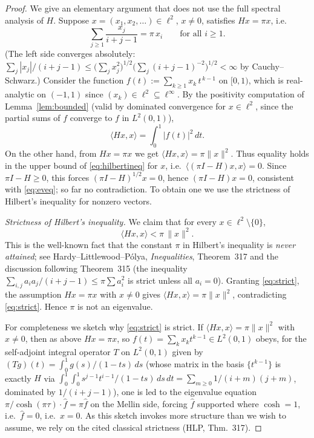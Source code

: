 \documentclass[12pt]{article}
\theoremstyle{remark}
\begin{document}
\begin{proof}
We give an elementary argument that does not use the full spectral analysis of $H$.
Suppose $x=(x_1,x_2,\dots)\in\ell^2$, $x\ne0$, satisfies $Hx=\pi x$, i.e.
\begin{equation}\label{eq:eveq}
\sum_{j\ge1}\frac{x_j}{i+j-1}=\pi\,x_i\qquad\text{for all }i\ge1 .
\end{equation}
(The left side converges absolutely: $\sum_j |x_j|/(i+j-1)\le\bigl(\sum_j x_j^2\bigr)^{1/2}
\bigl(\sum_j (i+j-1)^{-2}\bigr)^{1/2}<\infty$ by Cauchy--Schwarz.)
Consider the function $f(t):=\sum_{k\ge1}x_k\,t^{\,k-1}$ on $[0,1)$, which is real-analytic on
$(-1,1)$ since $(x_k)\in\ell^2\subseteq\ell^\infty$. By the positivity computation of
Lemma~\ref{lem:bounded} (valid by dominated convergence for $x\in\ell^2$, since the partial sums
of $f$ converge to $f$ in $L^2(0,1)$),
\[
\langle Hx,x\rangle=\int_0^1 |f(t)|^2\,dt .
\]
On the other hand, from $Hx=\pi x$ we get $\langle Hx,x\rangle=\pi\|x\|^2$. Thus equality holds in
the upper bound of \eqref{eq:hilbertineq} for $x$, i.e.\ $\langle (\pi I-H)x,x\rangle=0$. Since
$\pi I-H\ge0$, this forces $(\pi I-H)^{1/2}x=0$, hence $(\pi I-H)x=0$, consistent with
\eqref{eq:eveq}; so far no contradiction. To obtain one we use the strictness of Hilbert's
inequality for nonzero vectors.

\emph{Strictness of Hilbert's inequality.} We claim that for every $x\in\ell^2\setminus\{0\}$,
\begin{equation}\label{eq:strict}
\langle Hx,x\rangle<\pi\,\|x\|^2 .
\end{equation}
This is the well-known fact that the constant $\pi$ in Hilbert's inequality is \emph{never
attained}; see Hardy--Littlewood--P\'olya, \emph{Inequalities}, Theorem~317 and the discussion
following Theorem~315 (the inequality $\sum_{i,j}a_ia_j/(i+j-1)\le\pi\sum a_i^2$ is strict unless
all $a_i=0$). Granting \eqref{eq:strict}, the assumption $Hx=\pi x$ with $x\ne0$ gives
$\langle Hx,x\rangle=\pi\|x\|^2$, contradicting \eqref{eq:strict}. Hence $\pi$ is not an
eigenvalue.

For completeness we sketch why \eqref{eq:strict} is strict. If $\langle Hx,x\rangle=\pi\|x\|^2$
with $x\ne0$, then as above $Hx=\pi x$, so $f(t)=\sum_k x_k t^{k-1}\in L^2(0,1)$ obeys, for the
self-adjoint integral operator $T$ on $L^2(0,1)$ given by $(Tg)(t)=\int_0^1 g(s)/(1-ts)\,ds$
(whose matrix in the basis $\{t^{k-1}\}$ is exactly $H$ via
$\int_0^1\!\int_0^1 s^{j-1}t^{i-1}/(1-ts)\,ds\,dt=\sum_{m\ge0}1/(i+m)(j+m)$, dominated by
$1/(i+j-1)$), one is led to the eigenvalue equation $\pi/\cosh(\pi\tau)\cdot\widehat f=\pi\widehat f$
on the Mellin side, forcing $\widehat f$ supported where $\cosh=1$, i.e.\ $\widehat f=0$, i.e.\
$x=0$. As this sketch invokes more structure than we wish to assume, we rely on the cited
classical strictness (HLP, Thm.~317).
\end{proof}
\end{document}

